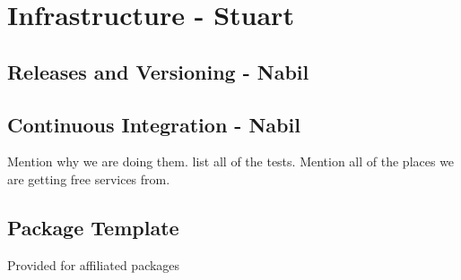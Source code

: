 \section{Infrastructure - Stuart}

\subsection{Releases and Versioning - Nabil}
\subsection{Continuous Integration - Nabil}
Mention why we are doing them.
list all of the tests. Mention all of the places we are getting free services from.
\subsection{Package Template}
Provided for affiliated packages